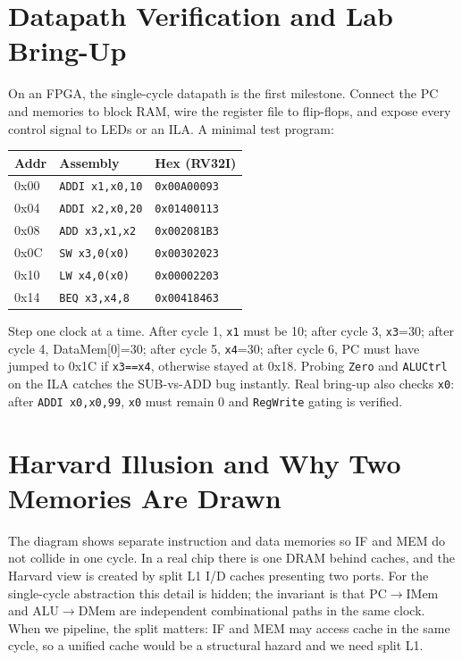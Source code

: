 \section{Datapath Verification and Lab Bring-Up}
On an FPGA, the single-cycle datapath is the first milestone. Connect the PC and memories to block RAM, wire the register file to flip-flops, and expose every control signal to LEDs or an ILA. A minimal test program:
\begin{center}
\small
\begin{tabular}{lll}
\toprule Addr & Assembly & Hex (RV32I) \\ \midrule
0x00 & \texttt{ADDI x1,x0,10} & \texttt{0x00A00093} \\
0x04 & \texttt{ADDI x2,x0,20} & \texttt{0x01400113} \\
0x08 & \texttt{ADD  x3,x1,x2} & \texttt{0x002081B3} \\
0x0C & \texttt{SW   x3,0(x0)} & \texttt{0x00302023} \\
0x10 & \texttt{LW   x4,0(x0)} & \texttt{0x00002203} \\
0x14 & \texttt{BEQ  x3,x4,8}  & \texttt{0x00418463} \\ \bottomrule
\end{tabular}
\end{center}
Step one clock at a time. After cycle 1, \texttt{x1} must be 10; after cycle 3, \texttt{x3}=30; after cycle 4, DataMem[0]=30; after cycle 5, \texttt{x4}=30; after cycle 6, PC must have jumped to 0x1C if \texttt{x3==x4}, otherwise stayed at 0x18. Probing \texttt{Zero} and \texttt{ALUCtrl} on the ILA catches the SUB-vs-ADD bug instantly. Real bring-up also checks \texttt{x0}: after \texttt{ADDI x0,x0,99}, \texttt{x0} must remain 0 and \texttt{RegWrite} gating is verified.

\section{Harvard Illusion and Why Two Memories Are Drawn}
The diagram shows separate instruction and data memories so IF and MEM do not collide in one cycle. In a real chip there is one DRAM behind caches, and the Harvard view is created by split L1 I/D caches presenting two ports. For the single-cycle abstraction this detail is hidden; the invariant is that PC$\to$IMem and ALU$\to$DMem are independent combinational paths in the same clock. When we pipeline, the split matters: IF and MEM may access cache in the same cycle, so a unified cache would be a structural hazard and we need split L1.

